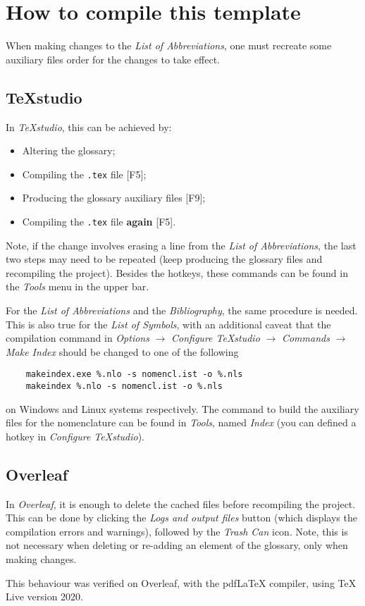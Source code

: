 \section{How to compile this template}

When making changes to the \textit{List of Abbreviations}, one must recreate some auxiliary files order for the changes to take effect.

\subsection{TeXstudio}

\noindent In \textit{TeXstudio}, this can be achieved by:
\begin{itemize}
	\item Altering the glossary;
	\item Compiling the \texttt{.tex} file [F5];
	\item Producing the glossary auxiliary files [F9];
	\item Compiling the \texttt{.tex} file \textbf{again} [F5].
\end{itemize}

\noindent Note, if the change involves erasing a line from the \textit{List of Abbreviations}, the last two steps may need to be repeated (keep producing the glossary files and recompiling the project). Besides the hotkeys, these commands can be found in the \textit{Tools} menu in the upper bar.

For the \textit{List of Abbreviations} and the \textit{Bibliography}, the same procedure is needed. This is also true for the \textit{List of Symbols}, with an additional caveat that the compilation command in \textit{Options} $\rightarrow$ \textit{Configure TeXstudio} $\rightarrow$ \textit{Commands} $\rightarrow$ \textit{Make Index} should be changed to one of the following
\begin{verbatim}
	makeindex.exe %.nlo -s nomencl.ist -o %.nls
	makeindex %.nlo -s nomencl.ist -o %.nls
\end{verbatim}

\noindent on Windows and Linux systems respectively. The command to build the auxiliary files for the nomenclature can be found in \textit{Tools}, named \textit{Index} (you can defined a hotkey in \textit{Configure TeXstudio}).

\subsection{Overleaf}

\noindent In \textit{Overleaf}, it is enough to delete the cached files before recompiling the project. This can be done by clicking the \textit{Logs and output files} button (which displays the compilation errors and warnings), followed by the \textit{Trash Can} icon. Note, this is not necessary when deleting or re-adding an element of the glossary, only when making changes.

This behaviour was verified on Overleaf, with the pdfLaTeX compiler, using TeX Live version 2020.



